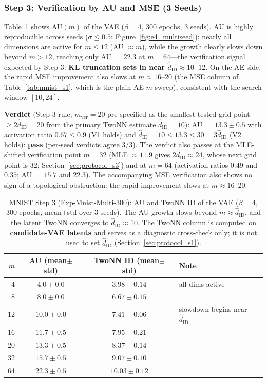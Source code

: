 \documentclass[make,article,submit,pdftex,moreauthors]{Definitions/mdpi}
\newcommand{\hatdID}{\hat{d}_{\mathrm{ID}}}
\begin{document}
\subsubsection{Step 3: Verification by AU and MSE (3 Seeds)}

Table~\ref{tab:mnist_s3} shows AU$(m)$ of the VAE ($\beta = 4$, 300 epochs,
3 seeds).
AU is highly reproducible across seeds
($\sigma \leq 0.5$; Figure~\ref{fig:e4_multiseed}); nearly all
dimensions are active for $m \leq 12$ (AU $\approx m$), while the growth
clearly slows down beyond $m > 12$, reaching only AU $= 22.3$ at
$m = 64$---the verification signal expected by Step 3:
\textbf{KL truncation sets in near $\hatdID \approx 10$--$12$}.
On the AE side, the rapid MSE improvement also slows at
$m \approx 16$--20 (the MSE column of Table~\ref{tab:mnist_s1}, which is the
plain-AE $m$-sweep), consistent with the search window $[10, 24]$.

\textbf{Verdict} (Step-3 rule; $m_{\mathrm{ver}} = 20$ pre-specified as
the smallest tested grid point $\geq 2\hatdID = 20$ from the primary TwoNN
estimate $\hatdID = 10$): AU $= 13.3 \pm 0.5$ with
activation ratio $0.67 \leq 0.9$ (V1 holds) and
$\hatdID = 10 \leq 13.3 \leq 30 = 3\hatdID$ (V2 holds): \textbf{pass}
(per-seed verdicts agree 3/3).
The verdict also passes at the MLE-shifted verification point $m = 32$
(MLE $\approx 11.9$ gives $2\hatdID \approx 24$, whose next grid point is
32; Section~\ref{sec:protocol_s3}) and at $m = 64$
(activation ratios $0.49$ and $0.35$; AU $= 15.7$ and $22.3$).
The accompanying MSE verification also shows no sign of a topological
obstruction: the rapid improvement slows at $m \approx 16$--20.

\begin{table}[H]
\caption{MNIST Step 3 (Exp-Mnist-Multi-300): AU and TwoNN ID of the VAE
($\beta = 4$, 300 epochs, mean$\pm$std over 3 seeds). The AU growth slows
beyond $m \approx \hatdID$, and the latent TwoNN converges to
$\hatdID \approx 10$. The TwoNN column is computed on \textbf{candidate-VAE
latents} and serves as a diagnostic cross-check only; it is not used to set
$\hatdID$ (Section~\ref{sec:protocol_s1}).}
\label{tab:mnist_s3}
\small
\begin{tabular}{rccl}
\toprule
$m$ & \textbf{AU (mean$\pm$std)} & \textbf{TwoNN ID (mean$\pm$std)} & \textbf{Note} \\
\midrule
 4 & $4.0 \pm 0.0$ & $3.98 \pm 0.14$ & all dims active \\
 8 & $8.0 \pm 0.0$ & $6.67 \pm 0.15$ & \\
12 & $10.0 \pm 0.0$ & $7.41 \pm 0.06$ & slowdown begins near $\hatdID$ \\
16 & $11.7 \pm 0.5$ & $7.95 \pm 0.21$ & \\
20 & $13.3 \pm 0.5$ & $8.37 \pm 0.14$ & \\
32 & $15.7 \pm 0.5$ & $9.07 \pm 0.10$ & \\
64 & $22.3 \pm 0.5$ & $10.03 \pm 0.12$ & \\
\bottomrule
\end{tabular}
\end{table}
\end{document}

